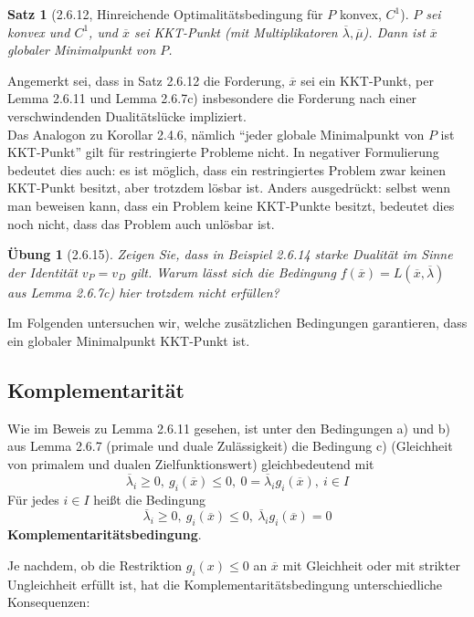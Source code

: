 \documentclass[12pt]{extreport} %
\theoremstyle{named}
\theoremstyle{nnamed}
\theoremstyle{itshape}
\newtheorem*{satz}{Satz}
\theoremstyle{normal}
\newtheorem*{uebung}{Übung}
\begin{document}
\begin{satz}[2.6.12, Hinreichende Optimalitätsbedingung für $P$ konvex, $C^1$]
	$P$ sei konvex und $C^1$, und $\overline{x}$ sei KKT-Punkt (mit Multiplikatoren $\overline{\lambda}, \overline{\mu}$). Dann ist $\overline{x}$ globaler Minimalpunkt von $P$.	
\end{satz}

Angemerkt sei, dass in Satz 2.6.12 die Forderung, $\overline{x}$ sei ein KKT-Punkt, per Lemma 2.6.11 und Lemma 2.6.7c) insbesondere die Forderung nach einer verschwindenden Dualitätslücke impliziert. ~\\
	
Das Analogon zu Korollar 2.4.6, nämlich \enquote{jeder globale Minimalpunkt von $P$ ist KKT-Punkt} gilt für restringierte Probleme nicht. In negativer Formulierung bedeutet dies auch: es ist möglich, dass ein restringiertes Problem zwar keinen KKT-Punkt besitzt, aber trotzdem lösbar ist. Anders ausgedrückt: selbst wenn man beweisen kann, dass ein Problem keine KKT-Punkte besitzt, bedeutet dies noch nicht, dass das Problem auch unlösbar ist.	
	
\begin{uebung}[2.6.15]
	Zeigen Sie, dass in Beispiel 2.6.14 starke Dualität im Sinne der Identität $v_P = v_D$ gilt. Warum lässt sich die Bedingung $f(\overline{x}) = L(\overline{x}, \overline{\lambda})$ aus Lemma 2.6.7c) hier trotzdem nicht erfüllen?
\end{uebung}
	
Im Folgenden untersuchen wir, welche zusätzlichen Bedingungen garantieren, dass ein globaler Minimalpunkt KKT-Punkt ist.		
	
\subsection*{Komplementarität}

Wie im Beweis zu Lemma 2.6.11 gesehen, ist unter den Bedingungen a) und b) aus Lemma 2.6.7 (primale und duale Zulässigkeit) die Bedingung c) (Gleichheit von primalem und dualen Zielfunktionswert) gleichbedeutend mit
	$$ \overline{\lambda}_i \geq 0, ~g_i(\overline{x}) \leq 0, ~0 = \overline{\lambda}_i g_i(\overline{x}), ~i \in I $$
Für jedes $i \in I$ heißt die Bedingung
	$$ \overline{\lambda}_i \geq 0, ~g_i(\overline{x}) \leq 0, ~\overline{\lambda}_i g_i(\overline{x}) = 0 $$
\textbf{Komplementaritätsbedingung}.	 \medskip

Je nachdem, ob die Restriktion $g_i(x) \leq 0$ an $\overline{x}$ mit Gleichheit oder mit strikter Ungleichheit erfüllt ist, hat die Komplementaritätsbedingung unterschiedliche Konsequenzen:
	
\end{document}
